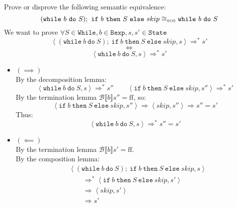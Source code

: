 \begin{exercise}{
    Prove or disprove the following semantic equivalence:
    \[ (\texttt{while}\ b\ \texttt{do}\ S);\ \texttt{if}\ b\ \texttt{then}\ S\ \texttt{else}\ skip \cong_{\text{\tiny SOS}} \texttt{while}\ b\ \texttt{do}\ S \]\vspace*{-0.6cm}
}
    We want to prove $\forall S \in \texttt{While}, b \in \texttt{Bexp}, s, s' \in \texttt{State}$
    \[ \left<(\texttt{while}\ b\ \texttt{do}\ S);\ \texttt{if}\ b\ \texttt{then}\ S\ \texttt{else}\ skip, s\right> \Rightarrow^* s' \]\vspace*{-0.9cm}
    \[ \iff \]\vspace*{-0.7cm}
    \[ \left<\texttt{while}\ b\ \texttt{do}\ S, s\right> \Rightarrow^* s' \]
    \begin{itemize}
        \item $(\implies)$ \vspace{0.2cm} \\
            By the decomposition lemma:\vspace*{-0.3cm}
            \[ \left<\texttt{while}\ b\ \texttt{do}\ S, s\right> \Rightarrow^* s'' \qquad \left<\texttt{if}\ b\ \texttt{then}\ S\ \texttt{else}\ skip, s''\right> \Rightarrow^* s' \]
            By the termination lemma $\mathcal{B} \llbracket b \rrbracket s'' = \text{ff}$, so:\vspace*{-0.3cm}
            \[ \left<\texttt{if}\ b\ \texttt{then}\ S\ \texttt{else}\ skip, s''\right> \Rightarrow \left<skip, s''\right> \Rightarrow s'' = s' \]
            Thus:
            \[ \left<\texttt{while}\ b\ \texttt{do}\ S, s\right> \Rightarrow^* s'' = s' \]
        \item $(\impliedby)$ \vspace{0.2cm} \\
            By the termination lemma $\mathcal{B} \llbracket b \rrbracket s' = \text{ff}$. \\
            By the composition lemma:\vspace*{-0.3cm}
            \begin{align*}
                &\left<(\texttt{while}\ b\ \texttt{do}\ S);\ \texttt{if}\ b\ \texttt{then}\ S\ \texttt{else}\ skip, s\right>
                \\&\qquad \Rightarrow^* \left<\texttt{if}\ b\ \texttt{then}\ S\ \texttt{else}\ skip, s'\right>
                \\&\qquad \Rightarrow \left<skip, s'\right>
                \\&\qquad \Rightarrow s'
            \end{align*}
    \end{itemize}
\end{exercise}
